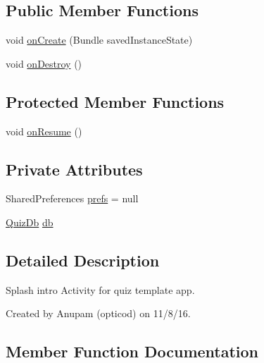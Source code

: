 \subsection*{Public Member Functions}
\begin{DoxyCompactItemize}
\item 
void \hyperlink{classorg_1_1buildmlearn_1_1quiztime_1_1activities_1_1SplashActivity_a70a6058d7d706dfd63ae5f7ca6b40faf}{on\+Create} (Bundle saved\+Instance\+State)
\item 
void \hyperlink{classorg_1_1buildmlearn_1_1quiztime_1_1activities_1_1SplashActivity_aa18e7a5149a2c0ffe1f21ee5d2903b87}{on\+Destroy} ()
\end{DoxyCompactItemize}
\subsection*{Protected Member Functions}
\begin{DoxyCompactItemize}
\item 
void \hyperlink{classorg_1_1buildmlearn_1_1quiztime_1_1activities_1_1SplashActivity_a44eb985e93c2f49b96414a11fe30c5fd}{on\+Resume} ()
\end{DoxyCompactItemize}
\subsection*{Private Attributes}
\begin{DoxyCompactItemize}
\item 
Shared\+Preferences \hyperlink{classorg_1_1buildmlearn_1_1quiztime_1_1activities_1_1SplashActivity_a4a67e0c81e083dc77ac92b1c23298c87}{prefs} = null
\item 
\hyperlink{classorg_1_1buildmlearn_1_1quiztime_1_1data_1_1QuizDb}{Quiz\+Db} \hyperlink{classorg_1_1buildmlearn_1_1quiztime_1_1activities_1_1SplashActivity_a5d95e5c14ac04921e443f04e2d364809}{db}
\end{DoxyCompactItemize}


\subsection{Detailed Description}
Splash intro Activity for quiz template app. 

Created by Anupam (opticod) on 11/8/16. 

\subsection{Member Function Documentation}
